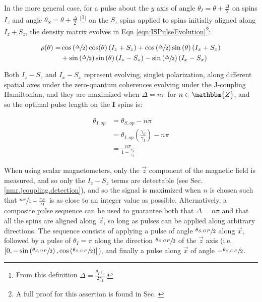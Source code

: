 \documentclass[PaulGanssle-Thesis.tex]{subfiles}
\begin{document}
In the more general case, for a pulse about the $y$ axis of angle $\theta_{I} = \theta + \frac{\Delta}{2}$ on spins $I_{z}$ and angle $\theta_{S} = \theta + \frac{\Delta}{2}$ $^{[}$\footnote{From this definition $\Delta = \frac{\theta_{I}\gamma_{S}}{2\gamma_{I}}$.}$^{]}$ on the $S_z$ spins applied to spins initially aligned along $I_{z} + S_{z}$, the density matrix evolves in Eqn \ref{eqn:ISPulseEvolution}\footnote{A full proof for this assertion is found in Sec. \label{proofs.qm.jcoupling.pulseapplied}}:

\begin{align}
\label{eqn:ISPulseEvolution}
\rho(\theta) = &  \cos\left(\sfrac{\Delta}{2}\right)\cos(\theta)\left(I_{z} + S_{z}\right) + \cos\left(\sfrac{\Delta}{2}\right)\sin\left(\theta\right)\left(I_{x} + S_{x}\right)\\
& + \sin\left(\sfrac{\Delta}{2}\right)\sin\left(\theta\right)\left(I_{z} - S_{z}\right) - \sin\left(\sfrac{\Delta}{2}\right)\left(I_{x}-S_{x}\right)
\end{align}

Both $I_{z} - S_{z}$ and $I_{x} - S_{x}$ represent evolving, singlet polarization, along different spatial axes under the zero-quantum coherences evolving under the J-coupling Hamiltonian, and they are maximized when $\Delta = n\pi$ for  $n \in \mathbbm{Z}$, and so the optimal pulse length on the $\mathbf{I}$ spins is:

\begin{align}
\theta_{I,op} & = \theta_{S,op} - n\pi \nonumber\\ 
& = \theta_{I,op}\left(\frac{\gamma_{S}}{\gamma_{I}}\right) - n\pi\nonumber \\
\label{eqn:ISpinTipAngleOptima}
& = \frac{n\pi}{1-\frac{\gamma_{S}}{\gamma_{I}}}
\end{align}

When using scalar magnetometers, only the $\vec{z}$ component of the magnetic field is measured, and so only the $I_{z} - S_{z}$ terms are detectable (see Sec. \ref{nmr.jcoupling.detection}), and so the signal is maximized when $n$ is chosen such that $\sfrac{n\pi}{1-\frac{\gamma_{S}}{\gamma_{I}}}$ is as close to an integer value as possible. Alternatively, a composite pulse sequence can be used to guarantee both that $\Delta = n\pi$ and that all the spins are aligned along $\vec{z}$, so long as pulses can be applied along arbitrary directions. The sequence consists of applying a pulse of angle $\sfrac{\theta_{S,OP}}{2}$ along $\vec{x}$, followed by a pulse of $\theta_{I} = \pi$ along the direction $\sfrac{\theta_{S,OP}}{2}$ of the $\vec{z}$ axis (i.e. $\left[0, -\sin\left(\sfrac{\theta_{S,OP}}{2}\right), \cos\left(\sfrac{\theta_{S,OP}}{2}\right)\right]$), and finally a pulse along $\vec{x}$ of angle $-\sfrac{\theta_{S,OP}}{2}$.
\end{document}
